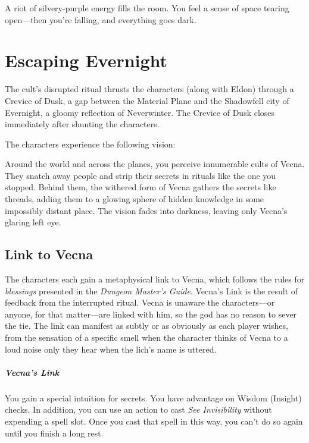 \documentclass[10pt,a4paper,twoside,bg=print,twocolumn,openany,nodeprecatedcode]{dndbook}
\begin{document}
\begin{DndReadAloud}{}
A riot of silvery-purple energy fills the room. You feel a sense of space tearing open—then you're falling, and everything goes dark.

\end{DndReadAloud}

\section{Escaping Evernight}
The cult's disrupted ritual thrusts the characters (along with Eldon) through a Crevice of Dusk, a gap between the Material Plane and the Shadowfell city of Evernight, a gloomy reflection of Neverwinter. The Crevice of Dusk closes immediately after shunting the characters.

The characters experience the following vision:

\begin{DndReadAloud}{}
Around the world and across the planes, you perceive innumerable cults of Vecna. They snatch away people and strip their secrets in rituals like the one you stopped. Behind them, the withered form of Vecna gathers the secrets like threads, adding them to a glowing sphere of hidden knowledge in some impossibly distant place. The vision fades into darkness, leaving only Vecna's glaring left eye.

\end{DndReadAloud}

\subsection{Link to Vecna}
The characters each gain a metaphysical link to Vecna, which follows the rules for \textit{blessings} presented in the \textit{Dungeon Master's Guide}. Vecna's Link is the result of feedback from the interrupted ritual. Vecna is unaware the characters—or anyone, for that matter—are linked with him, so the god has no reason to sever the tie. The link can manifest as subtly or as obviously as each player wishes, from the sensation of a specific smell when the character thinks of Vecna to a loud noise only they hear when the lich's name is uttered.

\begin{DndReadAloud}{}
\subparagraph{Vecna's Link}
You gain a special intuition for secrets. You have advantage on Wisdom (Insight) checks. In addition, you can use an action to cast \textit{See Invisibility} without expending a spell slot. Once you cast that spell in this way, you can't do so again until you finish a long rest.

\end{DndReadAloud}
\end{document}
